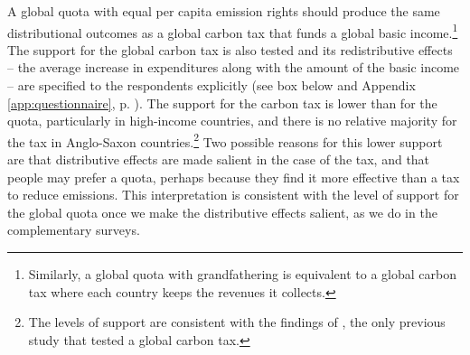 A global quota with equal per capita emission rights should produce the same distributional outcomes as a global carbon tax that funds a global basic income.\footnote{Similarly,  a global quota with grandfathering is equivalent to a global carbon tax where each country keeps the revenues it collects.} The support for the global carbon tax is also tested and its redistributive effects --  the average increase in expenditures along with the amount of the basic income -- are specified to the respondents explicitly  (see box below and Appendix \ref{app:questionnaire}, p. \pageref{subsec:questionnaire_GCS}). %
The support for the carbon tax is lower than for the quota, particularly in high-income countries, and there is no relative majority for the tax in Anglo-Saxon countries.\footnote{The levels of support are consistent with the findings of \citet{carattini_how_2019}, the only previous study that tested a global carbon tax.} Two possible reasons for this lower support are that distributive effects are made salient in the case of the tax, and that people may prefer a quota, perhaps because they find it more effective than a tax to reduce emissions. This interpretation is consistent with the level of support for the global quota once we make the distributive effects salient, as we do in the complementary surveys.




